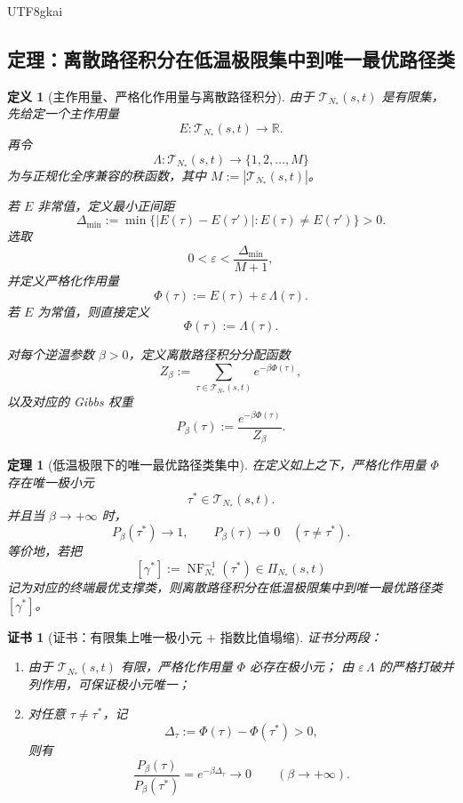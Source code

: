 \documentclass[12pt]{article}
\newtheorem{definition}{定义}[section]
\newtheorem{theorem}{定理}[section]
\newtheorem{Certificate}{证书}[section]
\newcommand{\RR}{\mathbb{R}}
\newcommand{\NF}{\operatorname{NF}}
\begin{document}
\begin{CJK*}{UTF8}{gkai}
\subsection{定理：离散路径积分在低温极限集中到唯一最优路径类}
\label{sec:tex38-optimal}

\begin{definition}[主作用量、严格化作用量与离散路径积分]
由于 $\mathcal{T}_{N_\ast}(s,t)$ 是有限集，先给定一个主作用量
\[
  E:\mathcal{T}_{N_\ast}(s,t)\to\RR.
\]
再令
\[
  \Lambda:\mathcal{T}_{N_\ast}(s,t)\to\{1,2,\dots,M\}
\]
为与正规化全序兼容的秩函数，其中 $M:=|\mathcal{T}_{N_\ast}(s,t)|$。

若 $E$ 非常值，定义最小正间距
\[
  \Delta_{\min}:=
  \min\bigl\{|E(\tau)-E(\tau')|:E(\tau)\neq E(\tau')\bigr\}>0.
\]
选取
\[
  0<\varepsilon<\frac{\Delta_{\min}}{M+1},
\]
并定义严格化作用量
\[
  \Phi(\tau):=E(\tau)+\varepsilon\,\Lambda(\tau).
\]
若 $E$ 为常值，则直接定义
\[
  \Phi(\tau):=\Lambda(\tau).
\]

对每个逆温参数 $\beta>0$，定义离散路径积分分配函数
\[
  Z_\beta:=
  \sum_{\tau\in \mathcal{T}_{N_\ast}(s,t)}
  e^{-\beta\Phi(\tau)},
\]
以及对应的 Gibbs 权重
\[
  P_\beta(\tau):=
  \frac{e^{-\beta\Phi(\tau)}}{Z_\beta}.
\]
\end{definition}

\begin{theorem}[低温极限下的唯一最优路径类集中]
\label{thm:tex38-optimal}
在定义如上之下，严格化作用量 $\Phi$ 存在唯一极小元
\[
  \tau^\ast\in \mathcal{T}_{N_\ast}(s,t).
\]
并且当 $\beta\to+\infty$ 时，
\[
  P_\beta(\tau^\ast)\to 1,
  \qquad
  P_\beta(\tau)\to 0\quad(\tau\neq\tau^\ast).
\]
等价地，若把
\[
  [\gamma^\ast]:=\NF_{N_\ast}^{-1}(\tau^\ast)\in \Pi_{N_\ast}(s,t)
\]
记为对应的终端最优支撑类，则离散路径积分在低温极限集中到唯一最优路径类 $[\gamma^\ast]$。
\end{theorem}

\begin{Certificate}[证书：有限集上唯一极小元 + 指数比值塌缩]
\label{cert:tex38-optimal}
证书分两段：
\begin{enumerate}
  \item 由于 $\mathcal{T}_{N_\ast}(s,t)$ 有限，严格化作用量 $\Phi$ 必存在极小元；
  由 $\varepsilon\,\Lambda$ 的严格打破并列作用，可保证极小元唯一；
  \item 对任意 $\tau\neq\tau^\ast$，记
  \[
    \Delta_\tau:=\Phi(\tau)-\Phi(\tau^\ast)>0,
  \]
  则有
  \[
    \frac{P_\beta(\tau)}{P_\beta(\tau^\ast)}=e^{-\beta\Delta_\tau}\to 0
    \qquad(\beta\to+\infty).
  \]
\end{enumerate}
\end{Certificate}


\end{CJK*}
\end{document}
